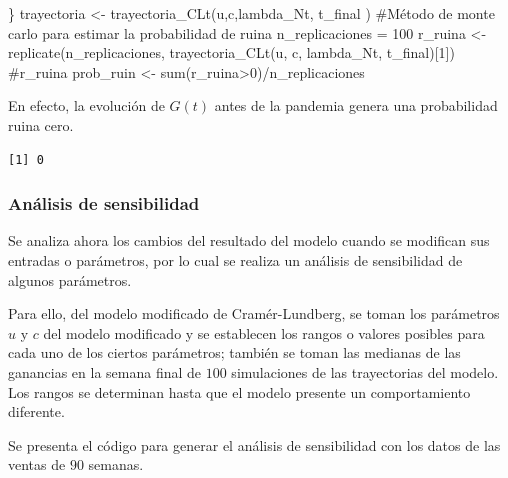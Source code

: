 \documentclass[
  us-letterpaper,
]{scrreprt}
\newenvironment{Shaded}{\begin{snugshade}}{\end{snugshade}}
\newcommand{\CommentTok}[1]{\textcolor[rgb]{0.37,0.37,0.37}{#1}}
\newcommand{\DecValTok}[1]{\textcolor[rgb]{0.68,0.00,0.00}{#1}}
\newcommand{\FunctionTok}[1]{\textcolor[rgb]{0.28,0.35,0.67}{#1}}
\newcommand{\NormalTok}[1]{\textcolor[rgb]{0.00,0.23,0.31}{#1}}
\newcommand{\OtherTok}[1]{\textcolor[rgb]{0.00,0.23,0.31}{#1}}
\newcommand{\SpecialCharTok}[1]{\textcolor[rgb]{0.37,0.37,0.37}{#1}}
\theoremstyle{plain}
\theoremstyle{plain}
\theoremstyle{definition}
\theoremstyle{remark}
\begin{document}
\begin{Shaded}
\begin{Highlighting}[]
\NormalTok{\}}
\NormalTok{trayectoria }\OtherTok{\textless{}{-}} \FunctionTok{trayectoria\_CLt}\NormalTok{(u,c,lambda\_Nt, t\_final )}
\CommentTok{\#Método de monte carlo para estimar la probabilidad de ruina}
\NormalTok{n\_replicaciones }\OtherTok{=} \DecValTok{100}
\NormalTok{r\_ruina }\OtherTok{\textless{}{-}} \FunctionTok{replicate}\NormalTok{(n\_replicaciones, }
            \FunctionTok{trayectoria\_CLt}\NormalTok{(u, c, lambda\_Nt, t\_final)[}\DecValTok{1}\NormalTok{])}
\CommentTok{\#r\_ruina}
\NormalTok{prob\_ruin }\OtherTok{\textless{}{-}} \FunctionTok{sum}\NormalTok{(r\_ruina}\SpecialCharTok{\textgreater{}}\DecValTok{0}\NormalTok{)}\SpecialCharTok{/}\NormalTok{n\_replicaciones}
\end{Highlighting}
\end{Shaded}

En efecto, la evolución de \(G(t)\) antes de la pandemia genera una
probabilidad ruina cero.

\begin{verbatim}
[1] 0
\end{verbatim}

\subsubsection{Análisis de
sensibilidad}\label{anuxe1lisis-de-sensibilidad}

Se analiza ahora los cambios del resultado del modelo cuando se
modifican sus entradas o parámetros, por lo cual se realiza un análisis
de sensibilidad de algunos parámetros.

Para ello, del modelo modificado de Cramér-Lundberg, se toman los
parámetros \(u\) y \(c\) del modelo modificado y se establecen los
rangos o valores posibles para cada uno de los ciertos parámetros;
también se toman las medianas de las ganancias en la semana final de
\(100\) simulaciones de las trayectorias del modelo. Los rangos se
determinan hasta que el modelo presente un comportamiento diferente.

Se presenta el código para generar el análisis de sensibilidad con los
datos de las ventas de \(90\) semanas.
\end{document}
